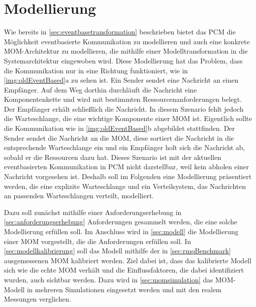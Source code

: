 
\chapter{Modellierung}
\label{ch:modellierung}
Wie bereits in \autoref{sec:eventbasetransformation} beschrieben bietet das PCM die Möglichkeit eventbasierte Kommunikation zu modellieren und auch eine konkrete MOM-Architektur zu modellieren, die mithilfe einer Modelltransformation in die Systemarchitektur eingewoben wird. Diese Modellierung hat das Problem, dass die Kommunikation nur in eine Richtung funktioniert, wie in \autoref{img:oldEventBased}a zu sehen ist. Ein Sender sendet eine Nachricht an einen Empfänger. Auf dem Weg dorthin durchläuft die Nachricht eine Komponentenkette und wird mit bestimmten Ressourcenanforderungen belegt. Der Empfänger erhält schließlich die Nachricht. In diesem Szenario fehlt jedoch die Warteschlange, die eine wichtige Komponente einer MOM ist. Eigentlich sollte die Kommunikation wie in \autoref{img:oldEventBased}b abgebildet stattfinden. Der Sender sendet die Nachricht an die MOM, diese sortiert die Nachricht in die entsprechende Warteschlange ein und ein Empfänger holt sich die Nachricht ab, sobald er die Ressourcen dazu hat. Dieses Szenario ist mit der aktuellen eventbasierten Kommunikation in PCM nicht darstellbar, weil kein abholen einer Nachricht vorgesehen ist. Deshalb soll im Folgenden eine Modellierung präsentiert werden, die eine explizite Warteschlange und ein Verteilsystem, das Nachrichten an passenden Warteschlangen verteilt, modelliert.\par
Dazu soll zunächst mithilfe einer Anforderungserhebung in \autoref{sec:anforderungserhebung} Anforderungen gesammelt werden, die eine solche Modellierung erfüllen soll. Im Anschluss wird in \autoref{sec:modell} die Modellierung einer MOM vorgestellt, die die Anforderungen erfüllen soll. In \autoref{sec:modellkalibrierung} soll das Modell mithilfe der in \autoref{sec:rmqBenchmark} ausgemessenen MOM kalibriert werden. Ziel dabei ist, dass das kalibrierte Modell sich wie die echte MOM verhält und die Einflussfaktoren, die dabei identifiziert wurden, auch sichtbar werden. Dazu wird in \autoref{sec:momsimulation} das MOM-Modell in mehreren Simulationen eingesetzt werden und mit den realem Messungen verglichen. 
